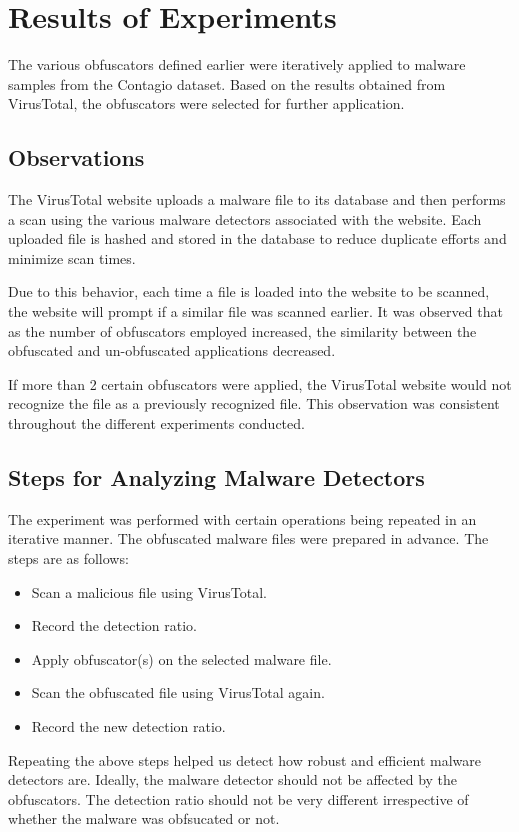 \chapter{Results of Experiments}

The various obfuscators defined earlier were iteratively applied to malware samples from the Contagio dataset. Based on the results obtained from VirusTotal, the obfuscators were selected for further application.

\section{Observations}

The VirusTotal website uploads a malware file to its database and then performs a scan using the various malware detectors associated with the website. 
Each uploaded file is hashed and stored in the database to reduce duplicate efforts and minimize scan times.

Due to this behavior, each time a file is loaded into the website to be scanned, the website will prompt if a similar file was scanned earlier. It was observed that as the number of obfuscators employed increased, the similarity between the obfuscated and un-obfuscated applications decreased.

If more than 2 certain obfuscators were applied, the VirusTotal website would not recognize the file as a previously recognized file. This observation was consistent throughout the different experiments conducted.

\section{Steps for Analyzing Malware Detectors}
The experiment was performed with certain operations being repeated in an iterative manner. The obfuscated malware files were prepared in advance. 
The steps are as follows:
\begin{itemize}
	\item Scan a malicious file using VirusTotal.
	\item Record the detection ratio.
	\item Apply obfuscator(s) on the selected malware file.
	\item Scan the obfuscated file using VirusTotal again.
	\item Record the new detection ratio.
\end{itemize}

Repeating the above steps helped us detect how robust and efficient malware detectors are. Ideally, the malware detector should not be affected by the obfuscators. The detection ratio should not be very different irrespective of whether the malware was obfsucated or not.

